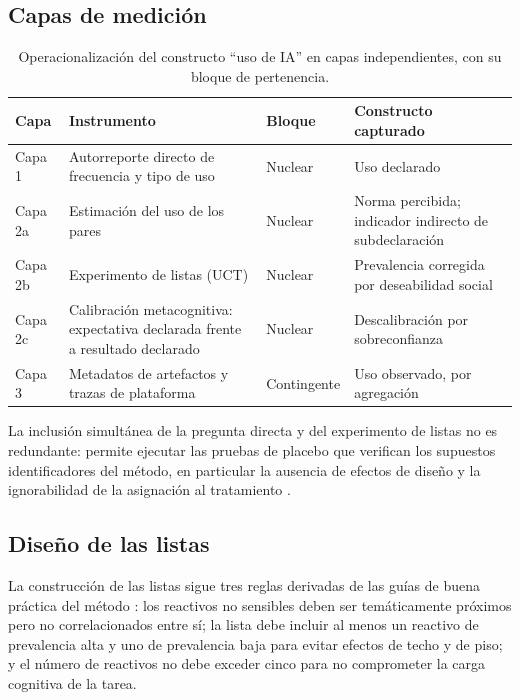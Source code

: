 \documentclass[11pt,a4paper]{article}
\begin{document}
\subsection{Capas de medición}

\begin{table}[htbp]
	\centering
	\small
	\caption{Operacionalización del constructo ``uso de IA'' en capas independientes, con su bloque de pertenencia.}
	\begin{tabularx}{\textwidth}{L{1.6cm} L{4.2cm} L{1.9cm} X}
		\toprule
		\textbf{Capa} & \textbf{Instrumento} & \textbf{Bloque} & \textbf{Constructo capturado} \\
		\midrule
		Capa 1 & Autorreporte directo de frecuencia y tipo de uso & Nuclear & Uso declarado \\
		\addlinespace
		Capa 2a & Estimación del uso de los pares & Nuclear & Norma percibida; indicador indirecto de subdeclaración \\
		\addlinespace
		Capa 2b & Experimento de listas (UCT) & Nuclear & Prevalencia corregida por deseabilidad social \\
		\addlinespace
		Capa 2c & Calibración metacognitiva: expectativa declarada frente a resultado declarado & Nuclear & Descalibración por sobreconfianza \\
		\addlinespace
		Capa 3 & Metadatos de artefactos y trazas de plataforma & Contingente & Uso observado, por agregación \\
		\bottomrule
	\end{tabularx}
\end{table}

La inclusión simultánea de la pregunta directa y del experimento de listas no es redundante: permite ejecutar las pruebas de placebo que verifican los supuestos identificadores del método, en particular la ausencia de efectos de diseño y la ignorabilidad de la asignación al tratamiento \citep{imai2011multivariate}.

\subsection{Diseño de las listas}

La construcción de las listas sigue tres reglas derivadas de las guías de buena práctica del método \citep{hinsley2019asking}: los reactivos no sensibles deben ser temáticamente próximos pero no correlacionados entre sí; la lista debe incluir al menos un reactivo de prevalencia alta y uno de prevalencia baja para evitar efectos de techo y de piso; y el número de reactivos no debe exceder cinco para no comprometer la carga cognitiva de la tarea.
\end{document}
